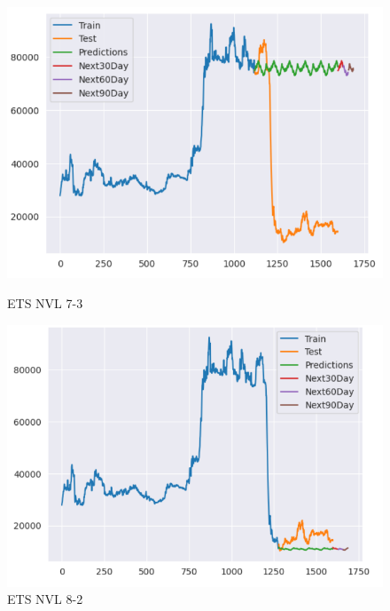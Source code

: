\documentclass[conference]{IEEEtran}
\begin{document}
\begin{enumerate}
\begin{figure}[htbp]
    \begin{minipage}{0.23\textwidth}
    \centering
    \includegraphics[width=1\textwidth]{experiment/ets/TEAM4_ETS_NVL_7_3.png}
    \caption{ETS NVL 7-3}
    \label{fig:nvl_boxplot}
    \end{minipage}
    \hfill
    \begin{minipage}{0.23\textwidth}
    \centering
    \includegraphics[width=1\textwidth]{experiment/ets/TEAM4_ETS_NVL_8_2.png}
    \caption{ETS NVL 8-2}
    \label{fig:nvl_histogram}
    \end{minipage}
    \begin{minipage}{0.23\textwidth}
    \centering

\end{minipage}
\end{figure}
\end{enumerate}
\end{document}
